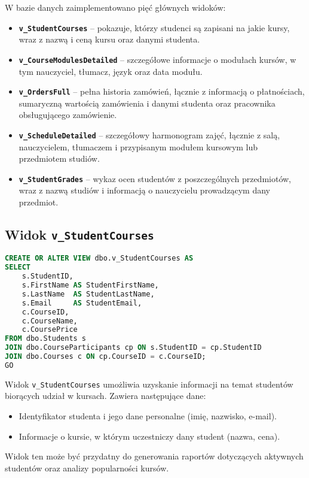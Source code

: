 \documentclass[12pt]{article}
\begin{document}
W bazie danych zaimplementowano pięć głównych widoków:

\begin{itemize}
    \item \textbf{\texttt{v\_StudentCourses}} – pokazuje, którzy studenci są zapisani na jakie kursy, wraz z nazwą i ceną kursu oraz danymi studenta.
    \item \textbf{\texttt{v\_CourseModulesDetailed}} – szczegółowe informacje o modułach kursów, w tym nauczyciel, tłumacz, język oraz data modułu.
    \item \textbf{\texttt{v\_OrdersFull}} – pełna historia zamówień, łącznie z informacją o płatnościach, sumaryczną wartością zamówienia i danymi studenta oraz pracownika obsługującego zamówienie.
    \item \textbf{\texttt{v\_ScheduleDetailed}} – szczegółowy harmonogram zajęć, łącznie z salą, nauczycielem, tłumaczem i przypisanym modułem kursowym lub przedmiotem studiów.
    \item \textbf{\texttt{v\_StudentGrades}} – wykaz ocen studentów z poszczególnych przedmiotów, wraz z nazwą studiów i informacją o nauczycielu prowadzącym dany przedmiot.
\end{itemize}

\subsection{Widok \texttt{v\_StudentCourses}}

\begin{lstlisting}[language=SQL]
CREATE OR ALTER VIEW dbo.v_StudentCourses AS
SELECT
    s.StudentID,
    s.FirstName AS StudentFirstName,
    s.LastName  AS StudentLastName,
    s.Email     AS StudentEmail,
    c.CourseID,
    c.CourseName,
    c.CoursePrice
FROM dbo.Students s
JOIN dbo.CourseParticipants cp ON s.StudentID = cp.StudentID
JOIN dbo.Courses c ON cp.CourseID = c.CourseID;
GO
\end{lstlisting}

\noindent Widok \texttt{v\_StudentCourses} umożliwia uzyskanie informacji na temat studentów biorących udział w kursach. Zawiera następujące dane:
\begin{itemize}
    \item Identyfikator studenta i jego dane personalne (imię, nazwisko, e-mail).
    \item Informacje o kursie, w którym uczestniczy dany student (nazwa, cena).
\end{itemize}
\noindent Widok ten może być przydatny do generowania raportów dotyczących aktywnych studentów oraz analizy popularności kursów.
\end{document}
